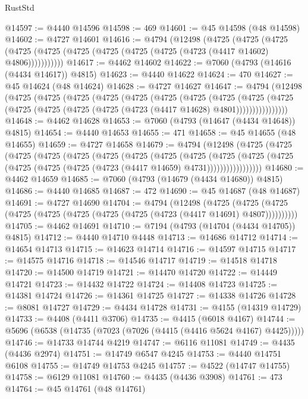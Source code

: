 \begin{lexlean}{RustStd}
\begin{coremodule}
@14597 := @4440 @14596
@14598 := 469
@14601 := @45 @14598 (@48 @14598)
@14602 := @4727 @14601
@14616 := @4794
    (@12498
      (@4725
        (@4725
          (@4725 (@4725 (@4725 (@4725 (@4725 (@4725 (@4725 (@4723 (@4417 @14602) @4806)))))))))))
@14617 := @4462 @14602
@14622 := @7060 (@4793 (@14616 (@4434 @14617)) @4815)
@14623 := @4440 @14622
@14624 := 470
@14627 := @45 @14624 (@48 @14624)
@14628 := @4727 @14627
@14647 := @4794
    (@12498
      (@4725
        (@4725
          (@4725
            (@4725
              (@4725
                (@4725
                  (@4725
                    (@4725
                      (@4725
                        (@4725
                          (@4725 (@4725 (@4725 (@4725 (@4723 (@4417 @14628) @4801))))))))))))))))
@14648 := @4462 @14628
@14653 := @7060 (@4793 (@14647 (@4434 @14648)) @4815)
@14654 := @4440 @14653
@14655 := 471
@14658 := @45 @14655 (@48 @14655)
@14659 := @4727 @14658
@14679 := @4794
    (@12498
      (@4725
        (@4725
          (@4725
            (@4725
              (@4725
                (@4725
                  (@4725
                    (@4725
                      (@4725
                        (@4725
                          (@4725
                            (@4725 (@4725 (@4725 (@4725 (@4723 (@4417 @14659) @4731)))))))))))))))))
@14680 := @4462 @14659
@14685 := @7060 (@4793 (@14679 (@4434 @14680)) @4815)
@14686 := @4440 @14685
@14687 := 472
@14690 := @45 @14687 (@48 @14687)
@14691 := @4727 @14690
@14704 := @4794
    (@12498
      (@4725 (@4725 (@4725 (@4725 (@4725 (@4725 (@4725 (@4725 (@4723 (@4417 @14691) @4807))))))))))
@14705 := @4462 @14691
@14710 := @7194 (@4793 (@14704 (@4434 @14705)) @4815)
@14712 := @4440 @14710 @4448
@14713 := @14686 @14712
@14714 := @14654 @14713
@14715 := @14623 @14714
@14716 := @14597 @14715
@14717 := @14575 @14716
@14718 := @14546 @14717
@14719 := @14518 @14718
@14720 := @14500 @14719
@14721 := @14470 @14720
@14722 := @14449 @14721
@14723 := @14432 @14722
@14724 := @14408 @14723
@14725 := @14381 @14724
@14726 := @14361 @14725
@14727 := @14338 @14726
@14728 := @8081 @14727
@14729 := @4434 @14728
@14731 := @4155 (@14319 @14729)
@14733 := @4408 (@4411 @3706)
@14735 := @4415 (@6018 @4167)
@14744 := @5696 (@6538 (@14735 (@7023 (@7026 (@4415 (@4416 @5624 @4167) @4425)))))
@14746 := @14733 @14744 @4219
@14747 := @6116 @11081
@14749 := @4435 (@4436 @2974)
@14751 := @14749 @6547 @4245
@14753 := @4440 @14751 @6108
@14755 := @14749 @14753 @4245
@14757 := @4522 (@14747 @14755)
@14758 := @6129 @11081
@14760 := @4435 (@4436 @3908)
@14761 := 473
@14764 := @45 @14761 (@48 @14761)

\end{coremodule}
\end{lexlean}
